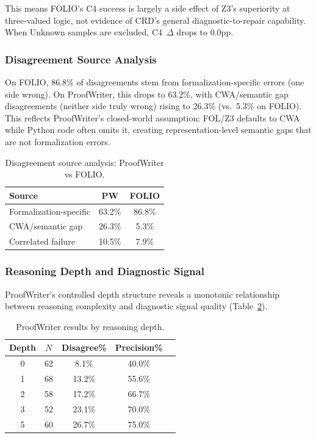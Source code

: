\documentclass[11pt,a4paper]{article}
\begin{document}
This means FOLIO's C4 success is largely a side effect of Z3's superiority at three-valued logic, not evidence of CRD's general diagnostic-to-repair capability. When Unknown samples are excluded, C4~$\Delta$ drops to 0.0pp.

\subsubsection{Disagreement Source Analysis}

On FOLIO, 86.8\% of disagreements stem from formalization-specific errors (one side wrong). On ProofWriter, this drops to 63.2\%, with CWA/semantic gap disagreements (neither side truly wrong) rising to 26.3\% (vs.\ 5.3\% on FOLIO). This reflects ProofWriter's closed-world assumption: FOL/Z3 defaults to CWA while Python code often omits it, creating representation-level semantic gaps that are not formalization errors.

\begin{table}[t]
\centering
\small
\caption{Disagreement source analysis: ProofWriter vs FOLIO.}
\label{tab:disagree_source}
\begin{tabular}{lcc}
\toprule
\textbf{Source} & \textbf{PW} & \textbf{FOLIO} \\
\midrule
Formalization-specific & 63.2\% & 86.8\% \\
CWA/semantic gap & 26.3\% & 5.3\% \\
Correlated failure & 10.5\% & 7.9\% \\
\bottomrule
\end{tabular}
\end{table}

\subsubsection{Reasoning Depth and Diagnostic Signal}

ProofWriter's controlled depth structure reveals a monotonic relationship between reasoning complexity and diagnostic signal quality (Table~\ref{tab:depth}).

\begin{table}[t]
\centering
\small
\caption{ProofWriter results by reasoning depth.}
\label{tab:depth}
\begin{tabular}{ccccc}
\toprule
\textbf{Depth} & $N$ & \textbf{Disagree\%} & \textbf{Precision\%} \\
\midrule
0 & 62 & 8.1\% & 40.0\% \\
1 & 68 & 13.2\% & 55.6\% \\
2 & 58 & 17.2\% & 66.7\% \\
3 & 52 & 23.1\% & 70.0\% \\
5 & 60 & 26.7\% & 75.0\% \\
\bottomrule
\end{tabular}
\end{table}
\end{document}
